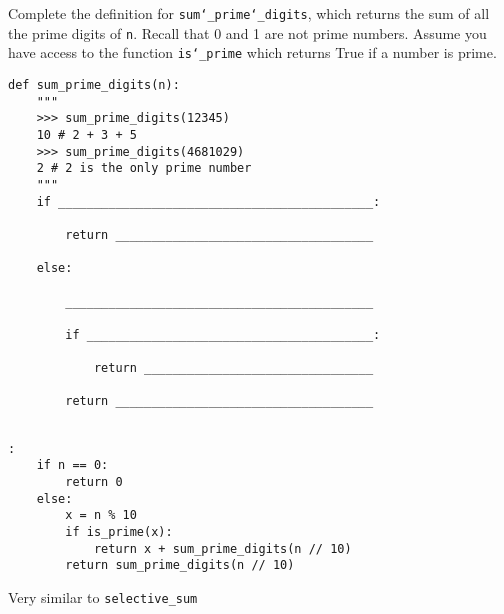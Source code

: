 \begin{blocksection}
\question Complete the definition for \texttt{sum\char`_prime\char`_digits}, which returns the sum of all the prime digits of \texttt{n}. Recall that 0 and 1 are not prime numbers. Assume you have access to the function \texttt{is\char`_prime} which returns True if a number is prime. \\

\begin{lstlisting}
def sum_prime_digits(n):
    """
    >>> sum_prime_digits(12345)
    10 # 2 + 3 + 5
    >>> sum_prime_digits(4681029)
    2 # 2 is the only prime number
    """
    if ____________________________________________:		

        return ____________________________________	

    else:

        ___________________________________________			

        if ________________________________________:		

            return ________________________________				

        return ____________________________________
				
\end{lstlisting}

\begin{solution}[1in]
\begin{lstlisting}:
    if n == 0:
        return 0
    else:
        x = n % 10
        if is_prime(x):
            return x + sum_prime_digits(n // 10)
        return sum_prime_digits(n // 10)
\end{lstlisting}
\end{solution}
\begin{questionmeta}
    Very similar to \lstinline{selective_sum}
\end{questionmeta}
\end{blocksection}
